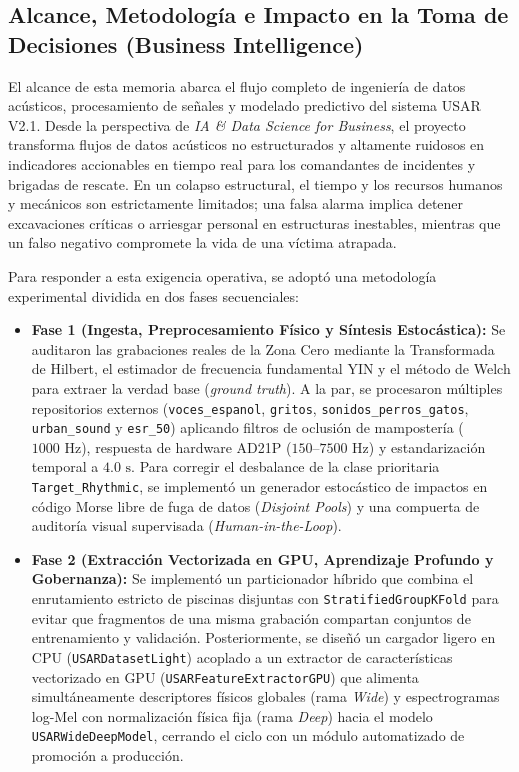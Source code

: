 \documentclass[11pt, a4paper]{article}
\begin{document}
\subsection{Alcance, Metodología e Impacto en la Toma de Decisiones (Business Intelligence)}
El alcance de esta memoria abarca el flujo completo de ingeniería de datos acústicos, procesamiento de señales y modelado predictivo del sistema USAR V2.1. Desde la perspectiva de \textit{IA \& Data Science for Business}, el proyecto transforma flujos de datos acústicos no estructurados y altamente ruidosos en indicadores accionables en tiempo real para los comandantes de incidentes y brigadas de rescate. En un colapso estructural, el tiempo y los recursos humanos y mecánicos son estrictamente limitados; una falsa alarma implica detener excavaciones críticas o arriesgar personal en estructuras inestables, mientras que un falso negativo compromete la vida de una víctima atrapada.

Para responder a esta exigencia operativa, se adoptó una metodología experimental dividida en dos fases secuenciales:
\begin{itemize}
    \item \textbf{Fase 1 (Ingesta, Preprocesamiento Físico y Síntesis Estocástica):} Se auditaron las grabaciones reales de la Zona Cero mediante la Transformada de Hilbert, el estimador de frecuencia fundamental YIN y el método de Welch para extraer la verdad base (\textit{ground truth}). A la par, se procesaron múltiples repositorios externos (\texttt{voces\_espanol}, \texttt{gritos}, \texttt{sonidos\_perros\_gatos}, \texttt{urban\_sound} y \texttt{esr\_50}) aplicando filtros de oclusión de mampostería ($1000\text{ Hz}$), respuesta de hardware AD21P ($150\text{--}7500\text{ Hz}$) y estandarización temporal a $4.0\text{ s}$. Para corregir el desbalance de la clase prioritaria \texttt{Target\_Rhythmic}, se implementó un generador estocástico de impactos en código Morse libre de fuga de datos (\textit{Disjoint Pools}) y una compuerta de auditoría visual supervisada (\textit{Human-in-the-Loop}).
    \item \textbf{Fase 2 (Extracción Vectorizada en GPU, Aprendizaje Profundo y Gobernanza):} Se implementó un particionador híbrido que combina el enrutamiento estricto de piscinas disjuntas con \texttt{StratifiedGroupKFold} para evitar que fragmentos de una misma grabación compartan conjuntos de entrenamiento y validación. Posteriormente, se diseñó un cargador ligero en CPU (\texttt{USARDatasetLight}) acoplado a un extractor de características vectorizado en GPU (\texttt{USARFeatureExtractorGPU}) que alimenta simultáneamente descriptores físicos globales (rama \textit{Wide}) y espectrogramas log-Mel con normalización física fija (rama \textit{Deep}) hacia el modelo \texttt{USARWideDeepModel}, cerrando el ciclo con un módulo automatizado de promoción a producción.
\end{itemize}
\end{document}

